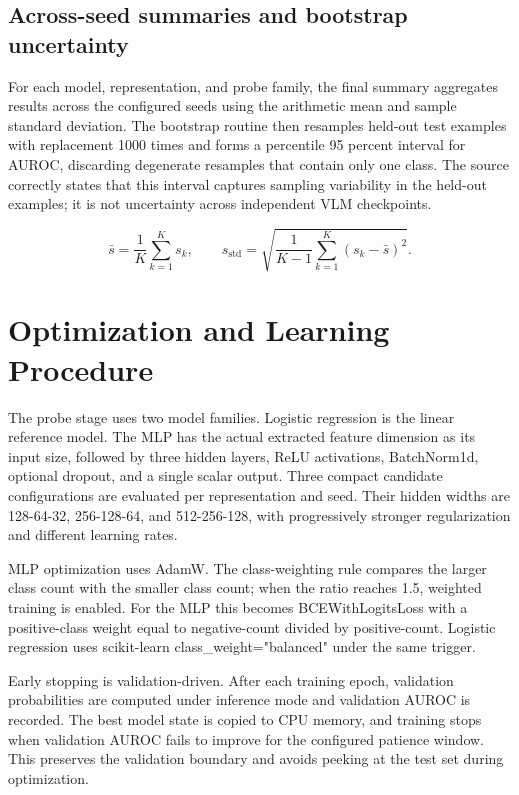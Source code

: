 \documentclass[11pt,a4paper]{article}
\begin{document}
\subsection{Across-seed summaries and bootstrap uncertainty}

For each model, representation, and probe family, the final summary aggregates results across the configured seeds using the arithmetic mean and sample standard deviation. The bootstrap routine then resamples held-out test examples with replacement 1000 times and forms a percentile 95 percent interval for AUROC, discarding degenerate resamples that contain only one class. The source correctly states that this interval captures sampling variability in the held-out examples; it is not uncertainty across independent VLM checkpoints.

\begin{equation}
\bar{s}=\frac{1}{K}\sum_{k=1}^{K}s_k,
\qquad
s_{\mathrm{std}}=\sqrt{\frac{1}{K-1}\sum_{k=1}^{K}(s_k-\bar{s})^2}.
\label{eq:seed-summary}
\end{equation}

\section{Optimization and Learning Procedure}

The probe stage uses two model families. Logistic regression is the linear reference model. The MLP has the actual extracted feature dimension as its input size, followed by three hidden layers, ReLU activations, BatchNorm1d, optional dropout, and a single scalar output. Three compact candidate configurations are evaluated per representation and seed. Their hidden widths are 128-64-32, 256-128-64, and 512-256-128, with progressively stronger regularization and different learning rates.

MLP optimization uses AdamW. The class-weighting rule compares the larger class count with the smaller class count; when the ratio reaches 1.5, weighted training is enabled. For the MLP this becomes BCEWithLogitsLoss with a positive-class weight equal to negative-count divided by positive-count. Logistic regression uses scikit-learn class\_weight="balanced" under the same trigger.

Early stopping is validation-driven. After each training epoch, validation probabilities are computed under inference mode and validation AUROC is recorded. The best model state is copied to CPU memory, and training stops when validation AUROC fails to improve for the configured patience window. This preserves the validation boundary and avoids peeking at the test set during optimization.
\end{document}
